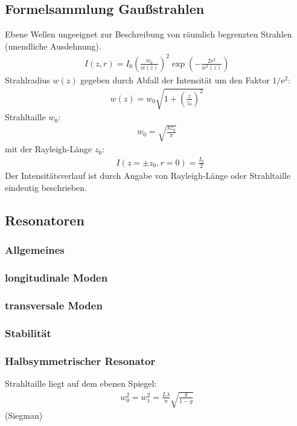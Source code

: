\documentclass[11pt, a4paper]{article}
\numberwithin{equation}{section}
\begin{document}
\subsection{Formelsammlung Gaußstrahlen \cite{linden}}
Ebene Wellen ungeeignet zur Beschreibung von räumlich begrenzten Strahlen (unendliche Ausdehnung).
\begin{align}
	I(z,r) = I_0 \left( \frac{w_0}{w(z)} \right)^2 \exp\left(- \frac{2 r^2}{w^2(z)} \right)
\end{align}
Strahlradius $w(z)$ gegeben durch Abfall der Intensität um den Faktor $1/\mathrm{e}^2$:
\begin{align}
	w(z) = w_0 \sqrt{1 + \left( \frac{z}{z_0} \right)^2}
	\label{eq:gauss_axialprofil}
\end{align}
Strahltaille $w_0$:
\begin{align}
	w_0 = \sqrt{\frac{\lambda z_0}{\pi}}
	\label{eq:rayleigh_laenge}
\end{align}
mit der Rayleigh-Länge $z_0$:
\begin{align}
	&I(z = \pm z_0, r =0) = \frac{I_0}{2}
\end{align}
Der Intensitätsverlauf ist durch Angabe von Rayleigh-Länge oder Strahltaille eindeutig beschrieben.

\subsection{Resonatoren}
\subsubsection{Allgemeines}
\subsubsection{longitudinale Moden}
\subsubsection{transversale Moden}
\subsubsection{Stabilität}
\subsubsection{Halbsymmetrischer Resonator}
Strahltaille liegt auf dem ebenen Spiegel:
\begin{align}
	w_0^2 = w_1^2 = \frac{L \lambda}{\pi} \sqrt{\frac{g}{1 - g}}
	\label{eq:strahltaille_halbsym}
\end{align} (Siegman)
\end{document}
